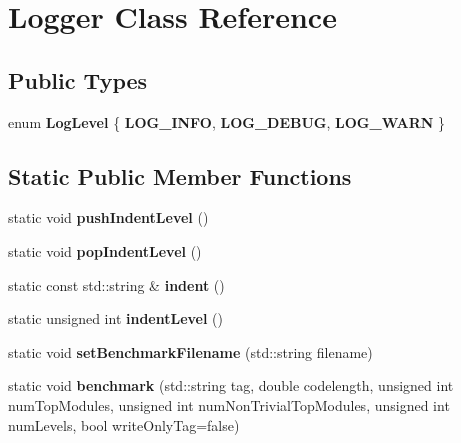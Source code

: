 \hypertarget{classLogger}{}\section{Logger Class Reference}
\label{classLogger}
\subsection*{Public Types}
\begin{DoxyCompactItemize}
\item 
\mbox{\label{classLogger_ac744681e23720966b5f430ec2060da36}} 
enum {\bfseries Log\+Level} \{ {\bfseries L\+O\+G\+\_\+\+I\+N\+FO}, 
{\bfseries L\+O\+G\+\_\+\+D\+E\+B\+UG}, 
{\bfseries L\+O\+G\+\_\+\+W\+A\+RN}
 \}
\end{DoxyCompactItemize}
\subsection*{Static Public Member Functions}
\begin{DoxyCompactItemize}
\item 
\mbox{\label{classLogger_a7b3f807b6571165771e06922741254a9}} 
static void {\bfseries push\+Indent\+Level} ()
\item 
\mbox{\label{classLogger_a083002f7662352961c4d99cce0f70697}} 
static void {\bfseries pop\+Indent\+Level} ()
\item 
\mbox{\label{classLogger_a449af95b2c2e0ff3b16634d73f1e5746}} 
static const std\+::string \& {\bfseries indent} ()
\item 
\mbox{\label{classLogger_a11ba981a8b6e48b3227c130919f6db75}} 
static unsigned int {\bfseries indent\+Level} ()
\item 
\mbox{\label{classLogger_ad85f91b2c2884df733bc08fec1802f98}} 
static void {\bfseries set\+Benchmark\+Filename} (std\+::string filename)
\item 
\mbox{\label{classLogger_a0aa000dfebfb2f44e8146878d8139baf}} 
static void {\bfseries benchmark} (std\+::string tag, double codelength, unsigned int num\+Top\+Modules, unsigned int num\+Non\+Trivial\+Top\+Modules, unsigned int num\+Levels, bool write\+Only\+Tag=false)
\end{DoxyCompactItemize}
